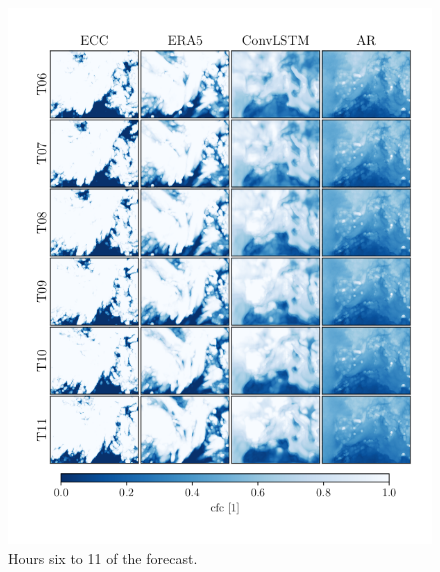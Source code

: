 \begin{figure}[ht]
    \centering
    \includegraphics{python_figs/comparing_seq_part_2_of4_jan2.png}
    \caption{Hours six to 11 of the forecast.}
    \label{fig:part2/4}
\end{figure}
